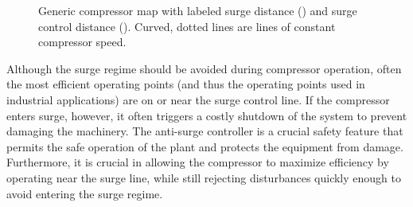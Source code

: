 \begin{figure}
  \centering
  
  \caption[Generic compressor map.]{Generic compressor map with labeled surge distance () and surge control distance (). Curved, dotted lines are lines of constant compressor speed.}
  \label{fig:intro:comp-map}
\end{figure}

Although the surge regime should be avoided during compressor operation, often the most efficient operating points (and thus the operating points used in industrial applications) are on or near the surge control line.
If the compressor enters surge, however, it often triggers a costly shutdown of the system to prevent damaging the machinery.
The anti-surge controller is a crucial safety feature that permits the safe operation of the plant and protects the equipment from damage.
Furthermore, it is crucial in allowing the compressor to maximize efficiency by operating near the surge line, while still rejecting disturbances quickly enough to avoid entering the surge regime.

